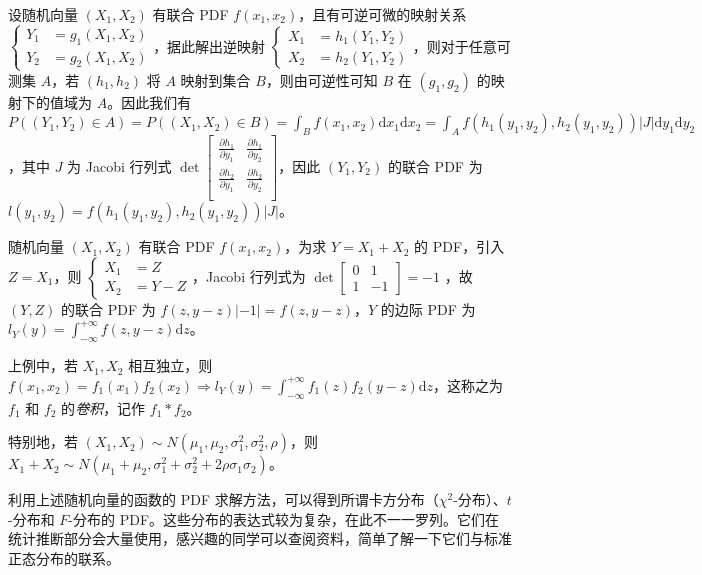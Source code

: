 \documentclass[../main.tex]{subfiles}
\begin{document}
设随机向量 $(X_1,X_2)$ 有联合 PDF $f(x_1,x_2)$，且有可逆可微的映射关系 $
    \left\{\begin{aligned}
        Y_1 & =g_1(X_1,X_2) \\
        Y_2 & =g_2(X_1,X_2)
    \end{aligned}\right.
$，据此解出逆映射 $
    \left\{\begin{aligned}
        X_1 & =h_1(Y_1,Y_2) \\
        X_2 & =h_2(Y_1,Y_2)
    \end{aligned}\right.
$，则对于任意可测集 $A$，若 $(h_1,h_2)$ 将 $A$ 映射到集合 $B$，则由可逆性可知 $B$ 在 $(g_1,g_2)$ 的映射下的值域为 $A$。因此我们有 $P((Y_1,Y_2)\in A)=P((X_1,X_2)\in B)=\int_Bf(x_1,x_2)\mathrm dx_1\mathrm dx_2=\int_Af(h_1(y_1,y_2),h_2(y_1,y_2))|J|\mathrm dy_1\mathrm dy_2$，其中 $J$ 为 Jacobi 行列式 $
    \det \left[\begin{matrix}
            \frac{\partial h_1}{\partial y_1} & \frac{\partial h_1}{\partial y_2} \\
            \frac{\partial h_2}{\partial y_1} & \frac{\partial h_2}{\partial y_2} \\
        \end{matrix}\right]
$，因此 $(Y_1,Y_2)$ 的联合 PDF 为 $l(y_1,y_2)=f(h_1(y_1,y_2),h_2(y_1,y_2))|J|$。

\begin{example}
    随机向量 $(X_1,X_2)$ 有联合 PDF $f(x_1,x_2)$，为求 $Y=X_1+X_2$ 的 PDF，引入 $Z=X_1$，则 $
        \left\{\begin{aligned}
            X_1 & =Z   \\
            X_2 & =Y-Z
        \end{aligned}\right.
    $，Jacobi 行列式为 $
        \det \left[\begin{matrix}
                0 & 1  \\
                1 & -1
            \end{matrix}\right]=-1
    $
    ，故 $(Y,Z)$ 的联合 PDF 为 $f(z,y-z)|-1|=f(z,y-z)$，$Y$ 的边际 PDF 为 $l_Y(y)=\int_{-\infty}^{+\infty}f(z,y-z)\mathrm dz$。
\end{example}

上例中，若 $X_1,X_2$ 相互独立，则 $f(x_1,x_2)=f_1(x_1)f_2(x_2)\Rightarrow l_Y(y)=\int_{-\infty}^{+\infty}f_1(z)f_2(y-z)\mathrm dz$，这称之为 $f_1$ 和 $f_2$ 的\emph{卷积}，记作 $f_1\ast f_2$。

特别地，若 $(X_1,X_2)\sim N(\mu_1,\mu_2,\sigma_1^2,\sigma_2^2,\rho)$，则 $X_1+X_2\sim N(\mu_1+\mu_2,\sigma_1^2+\sigma_2^2+2\rho\sigma_1\sigma_2)$。

利用上述随机向量的函数的 PDF 求解方法，可以得到所谓卡方分布（$\chi^2$-分布）、$t$-分布和 $F$-分布的 PDF。这些分布的表达式较为复杂，在此不一一罗列。它们在统计推断部分会大量使用，感兴趣的同学可以查阅资料，简单了解一下它们与标准正态分布的联系。
\end{document}
